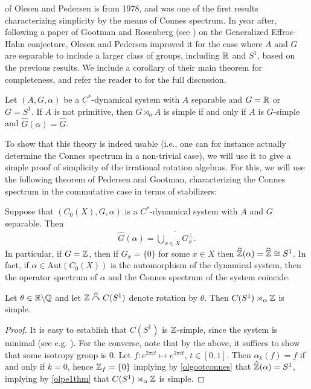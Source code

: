  of Olesen and Pedersen is from 1978, and was one of the first results characterizing simplicity by the means of Connes spectrum. In year after, following a paper of Gootman and Rosenberg (see \cite{gootman1979structure}) on the Generalized Effros-Hahn conjecture, Olesen and Pedersen improved it for the case where $A$ and $G$ are separable to include a larger class of groups, including $\mathbb{R}$ and $S^1$, based on the previous results. We include a corollary of their main theorem for completeness, and refer the reader to \cite{olesenpedersen2} for the full discussion.
\begin{corollary}
	Let $(A,G,\alpha)$ be a $C^*$-dynamical system with $A$ separable and $G = \mathbb{R}$ or $G=S^1$. If $A$ is not primitive, then $G \rtimes_\alpha A$ is simple if and only if $A$ is $G$-simple and $\hat G(\alpha) = \hat G$.
\end{corollary}

To show that this theory is indeed usable (i.e., one can for instance actually determine the Connes spectrum in a non-trivial case), we will use it to give a simple proof of simplicity of the irrational rotation algebras. For this, we will use the following theorem of Pedersen and Gootman, characterizing the Connes spectrum in the commutative case in terms of stabilizers:
\begin{theorem}
	Suppose that $(C_0(X),G,\alpha)$ is a $C^*$-dynamical system with $A$ and $G$ separable. Then
	\begin{align*}
		\hat G(\alpha) = \overline{\bigcup_{x \in X} G_x^\perp}.
	\end{align*}
	 In particular, if $G = \mathbb{Z}$, then if $G_x=\{0\}$ for some $x \in X$ then $\widehat{\mathbb{Z}}(\alpha) = \widehat{\mathbb{Z}} \cong S^1$. In fact, if $\alpha \in \mathrm{Aut}(C_0(X))$ is the automorphism of the dynamical system, then the operator spectrum of $\alpha$ and the Connes spectrum of the system coincide.
	\label{olgootconnes}
\end{theorem}
\begin{example}
	Let $\theta \in \mathbb{R} \backslash \mathbb{Q}$ and let $\mathbb{Z} \stackrel{\alpha}{\curvearrowright} C(S^1)$ denote rotation by $\theta$. Then $C(S^1) \rtimes_\alpha \mathbb{Z}$ is simple.
\end{example}
\begin{proof}
	It is easy to establish that $C(S^1)$ is $\mathbb{Z}$-simple, since the system is minimal (see e.g.  \cite[5.2]{glasner1976proximal}). For the converse, note that by the above, it suffices to show that some isotropy group is $0$. Let $f \colon e^{2 \pi i t} \mapsto e^{2 \pi i t}$, $t \in [0,1]$. Then $\alpha_k(f) = f$ if and only if $k = 0$, hence $\mathbb{Z}_{f} = \{0\}$ implying by \cref{olgootconnes} that $\widehat{\mathbb{Z}} (\alpha) = S^1$, implying by \cref{olpe1thm} that $C(S^1) \rtimes_\alpha \mathbb{Z}$ is simple.
\end{proof}
